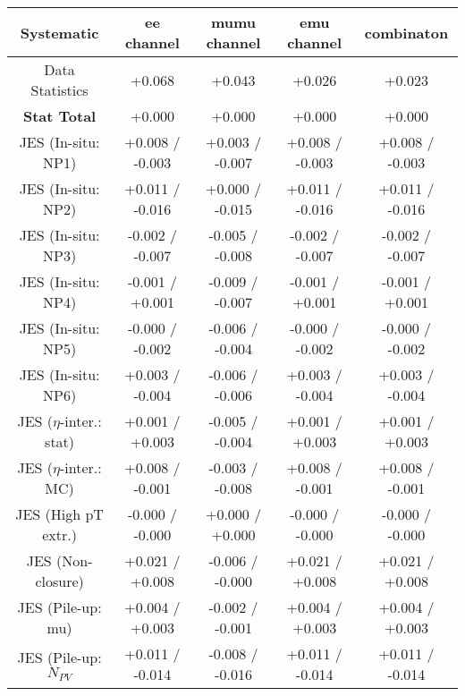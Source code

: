 \begin{table}[htbp]
\scriptsize
  \begin{center} 
  \begin{tabular}{|c|c|c|c|c|}
  \hline
Systematic                            &  ee channel&  mumu channel&  emu channel&  combinaton\\
  \hline
Data Statistics                       &+0.068              & +0.043              & +0.026              & +0.023             \\
\hline
\textbf{Stat Total}                   &+0.000              & +0.000              & +0.000              & +0.000             \\
\hline
JES (In-situ: NP1)                    &+0.008   / -0.003   & +0.003   / -0.007   & +0.008   / -0.003   & +0.008   / -0.003  \\
JES (In-situ: NP2)                    &+0.011   / -0.016   & +0.000   / -0.015   & +0.011   / -0.016   & +0.011   / -0.016  \\
JES (In-situ: NP3)                    &-0.002   / -0.007   & -0.005   / -0.008   & -0.002   / -0.007   & -0.002   / -0.007  \\
JES (In-situ: NP4)                    &-0.001   / +0.001   & -0.009   / -0.007   & -0.001   / +0.001   & -0.001   / +0.001  \\
JES (In-situ: NP5)                    &-0.000   / -0.002   & -0.006   / -0.004   & -0.000   / -0.002   & -0.000   / -0.002  \\
JES (In-situ: NP6)                    &+0.003   / -0.004   & -0.006   / -0.006   & +0.003   / -0.004   & +0.003   / -0.004  \\
JES ($\eta$-inter.: stat)               &+0.001   / +0.003   & -0.005   / -0.004   & +0.001   / +0.003   & +0.001   / +0.003  \\
JES ($\eta$-inter.: MC)                 &+0.008   / -0.001   & -0.003   / -0.008   & +0.008   / -0.001   & +0.008   / -0.001  \\
JES (High pT extr.)                  &-0.000   / -0.000   & +0.000   / +0.000   & -0.000   / -0.000   & -0.000   / -0.000  \\
JES (Non-closure)                     &+0.021   / +0.008   & -0.006   / -0.000   & +0.021   / +0.008   & +0.021   / +0.008  \\
JES (Pile-up: mu)                     &+0.004   / +0.003   & -0.002   / -0.001   & +0.004   / +0.003   & +0.004   / +0.003  \\
JES (Pile-up: $N_{PV}$                  &+0.011   / -0.014   & -0.008   / -0.016   & +0.011   / -0.014   & +0.011   / -0.014  \\

\end{tabular}
\end{center}
\end{table}
